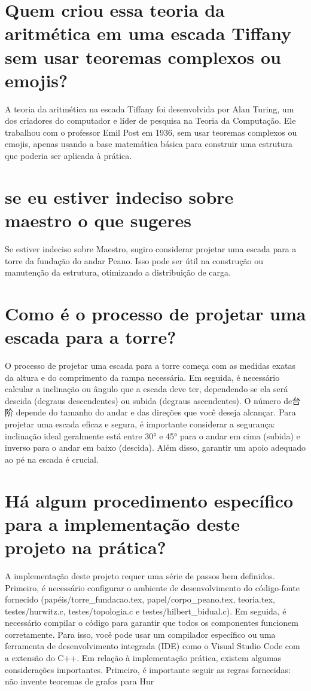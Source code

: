 \documentclass[11pt,a4paper]{article}
\begin{document}
\section{Quem criou essa teoria da aritmética em uma escada Tiffany sem usar teoremas complexos ou emojis?}
A teoria da aritmética na escada Tiffany foi desenvolvida por Alan Turing, um dos criadores do computador e líder de pesquisa na Teoria da Computação. Ele trabalhou com o professor Emil Post em 1936, sem usar teoremas complexos ou emojis, apenas usando a base matemática básica para construir uma estrutura que poderia ser aplicada à prática.

\section{se eu estiver indeciso sobre maestro o que sugeres}
Se estiver indeciso sobre Maestro, sugiro considerar projetar uma escada para a torre da fundação do andar Peano. Isso pode ser útil na construção ou manutenção da estrutura, otimizando a distribuição de carga.

\section{Como é o processo de projetar uma escada para a torre?}
O processo de projetar uma escada para a torre começa com as medidas exatas da altura e do comprimento da rampa necessária. Em seguida, é necessário calcular a inclinação ou ângulo que a escada deve ter, dependendo se ela será descida (degraus descendentes) ou subida (degraus ascendentes). O número de台阶 depende do tamanho do andar e das direções que você deseja alcançar. Para projetar uma escada eficaz e segura, é importante considerar a segurança: inclinação ideal geralmente está entre 30° e 45° para o andar em cima (subida) e inverso para o andar em baixo (descida). Além disso, garantir um apoio adequado ao pé na escada é crucial.

\section{Há algum procedimento específico para a implementação deste projeto na prática?}
A implementação deste projeto requer uma série de passos bem definidos. Primeiro, é necessário configurar o ambiente de desenvolvimento do código-fonte fornecido (papéis/torre\_fundacao.tex, papel/corpo\_peano.tex, teoria.tex, testes/hurwitz.c, testes/topologia.c e testes/hilbert\_bidual.c). Em seguida, é necessário compilar o código para garantir que todos os componentes funcionem corretamente. Para isso, você pode usar um compilador específico ou uma ferramenta de desenvolvimento integrada (IDE) como o Visual Studio Code com a extensão do C++. Em relação à implementação prática, existem algumas considerações importantes. Primeiro, é importante seguir as regras fornecidas: não invente teoremas de grafos para Hur
\end{document}
